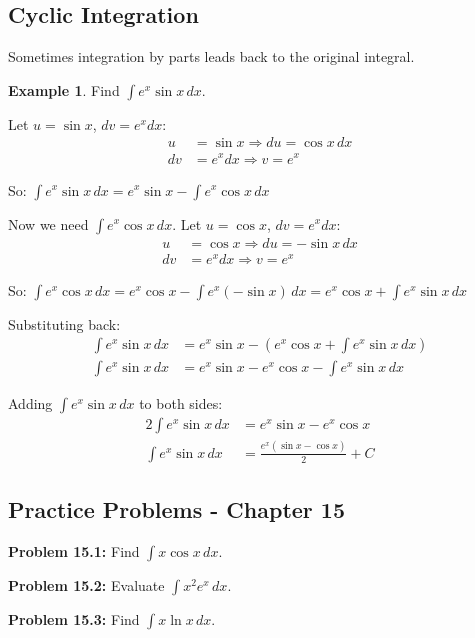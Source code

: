 \documentclass[12pt,a4paper]{book}
\theoremstyle{definition}
\newtheorem{example}{Example}[chapter]
\begin{document}
\subsection{Cyclic Integration}

Sometimes integration by parts leads back to the original integral.

\begin{example}
Find $\int e^x \sin x \, dx$.

Let $u = \sin x$, $dv = e^x dx$:
\begin{align}
u &= \sin x \Rightarrow du = \cos x \, dx\\
dv &= e^x dx \Rightarrow v = e^x
\end{align}

So: $\int e^x \sin x \, dx = e^x \sin x - \int e^x \cos x \, dx$

Now we need $\int e^x \cos x \, dx$. Let $u = \cos x$, $dv = e^x dx$:
\begin{align}
u &= \cos x \Rightarrow du = -\sin x \, dx\\
dv &= e^x dx \Rightarrow v = e^x
\end{align}

So: $\int e^x \cos x \, dx = e^x \cos x - \int e^x(-\sin x) \, dx = e^x \cos x + \int e^x \sin x \, dx$

Substituting back:
\begin{align}
\int e^x \sin x \, dx &= e^x \sin x - (e^x \cos x + \int e^x \sin x \, dx)\\
\int e^x \sin x \, dx &= e^x \sin x - e^x \cos x - \int e^x \sin x \, dx
\end{align}

Adding $\int e^x \sin x \, dx$ to both sides:
\begin{align}
2\int e^x \sin x \, dx &= e^x \sin x - e^x \cos x\\
\int e^x \sin x \, dx &= \frac{e^x(\sin x - \cos x)}{2} + C
\end{align}
\end{example}

\subsection{Practice Problems - Chapter 15}

\textbf{Problem 15.1:} Find $\int x \cos x \, dx$.

\textbf{Problem 15.2:} Evaluate $\int x^2 e^x \, dx$.

\textbf{Problem 15.3:} Find $\int x \ln x \, dx$.
\end{document}
